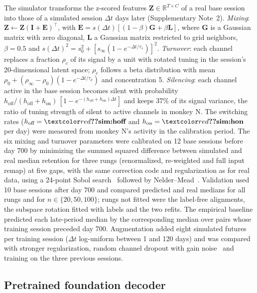 \documentclass{iopjournal}
\begin{document}
The simulator transforms the z-scored features $\mathbf{Z} \in \mathbb{R}^{T\times C}$ of a real base session into those
of a simulated session $\Delta t$ days later (Supplementary Note~2). \textit{Mixing}: $\mathbf{Z} \leftarrow
\mathbf{Z}(\mathbf{I} + \mathbf{E})^\top$, with $\mathbf{E} = s(\Delta t)[(1 - \beta)\mathbf{G} + \beta\mathbf{L}]$, where
$\mathbf{G}$ is a Gaussian matrix with zero diagonal, $\mathbf{L}$ a Gaussian matrix restricted to grid neighbors,
$\beta = 0.5$ and $s(\Delta t)^2 = s_0^2 + [s_\infty(1 - e^{-\Delta t/\tau_s})]^2$. \textit{Turnover}: each channel
replaces a fraction $\rho_c$ of its signal by a unit with rotated tuning in the session's 20-dimensional latent space;
$\rho_c$ follows a beta distribution with mean $\rho_0 + (\rho_\infty - \rho_0)(1 - e^{-\Delta t/\tau_\rho})$ and
concentration 5. \textit{Silencing}: each channel active in the base session becomes silent with probability
$h_{\text{off}}/(h_{\text{off}} + h_{\text{on}})\,[1 - e^{-(h_{\text{off}} + h_{\text{on}})\Delta t}]$ and keeps 37\% of
its signal variance, the ratio of tuning strength of silent to active channels in monkey N. The switching rates
($h_{\text{off}} = \val{sim:hoff}$ and $h_{\text{on}} = \val{sim:hon}$ per day) were measured from monkey N's activity in
the calibration period. The six mixing and turnover parameters were calibrated on 12 base sessions before day 700 by
minimizing the summed squared difference between simulated and real median retention for three rungs (renormalized,
re-weighted and full input remap) at five gaps, with the same correction code and regularization as for real data,
using a 24-point Sobol search~\cite{sobol1967} followed by Nelder--Mead~\cite{nelder1965}. Validation used 10 base sessions
after day 700 and compared predicted and real medians for all rungs and for $n \in \{20, 50, 100\}$; rungs not fitted
were the label-free alignments, the subspace rotation fitted with labels and the two refits. The empirical baseline
predicted each late-period median by the corresponding median over pairs whose training session preceded day 700.
Augmentation added eight simulated futures per training session ($\Delta t$ log-uniform between 1 and 120 days) and was
compared with stronger regularization, random channel dropout with gain noise~\cite{sussillo2016} and training on the
three previous sessions.

\subsection{Pretrained foundation decoder}
\end{document}
